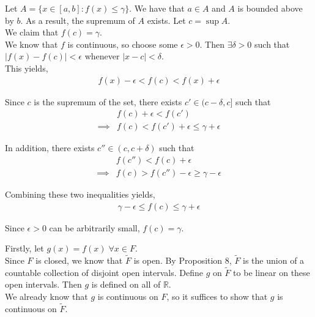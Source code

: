 \documentclass[12pt]{article}
\newenvironment{problem}[2][Problem]{\begin{trivlist}
\item[\hskip \labelsep {\bfseries #1}\hskip \labelsep {\bfseries #2.}]}{\end{trivlist}}
\begin{document}
Let $A = \{x \in [a, b]: f(x) \leq \gamma\}$. We have that $a \in A$ and $A$ is bounded above by $b$. As a result, the supremum of $A$ exists. Let $c = \sup A$.\\

We claim that $f(c) = \gamma$.\\

We know that $f$ is continuous, so choose some $\epsilon > 0$. Then $\exists \delta > 0$ such that $|f(x) - f(c)| < \epsilon$ whenever $|x - c| < \delta$.\\

This yields,
\begin{align*}
f(x) - \epsilon < f(c) < f(x) + \epsilon
\end{align*}

Since $c$ is the supremum of the set, there exists $c' \in (c - \delta, c]$ such that
\begin{align*}
&f(c) + \epsilon < f(c')\\
\implies &f(c) < f(c') + \epsilon \leq \gamma + \epsilon
\end{align*}

In addition, there exists $c'' \in (c, c + \delta)$ such that 
\begin{align*}
&f(c'') < f(c) + \epsilon\\
\implies &f(c) > f(c'') - \epsilon \geq \gamma - \epsilon
\end{align*}

Combining these two inequalities yields, 
\begin{align*}
\gamma - \epsilon \leq f(c) \leq \gamma + \epsilon
\end{align*}

Since $\epsilon > 0$ can be arbitrarily small, $f(c) = \gamma$.

\begin{problem}{3}
\end{problem}

Firstly, let $g(x) = f(x) \; \forall x \in F$.\\

Since $F$ is closed, we know that $\tilde{F}$ is open. By Proposition 8, $\tilde{F}$ is the union of a countable collection of disjoint open intervals. Define $g$ on $\tilde{F}$ to be linear on these open intervals. Then $g$ is defined on all of $\mathbb{R}$.\\

We already know that $g$ is continuous on $F$, so it suffices to show that $g$ is continuous on $\tilde{F}$.\\
\end{document}
